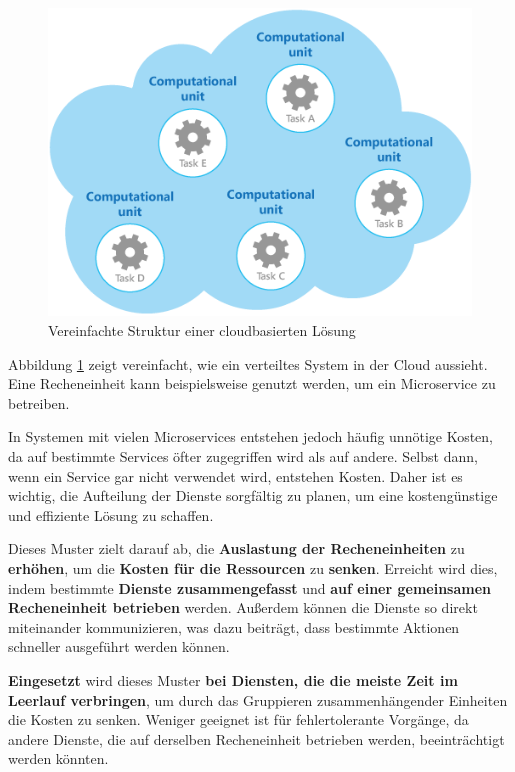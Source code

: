     \begin{figure}[H]
        \centering
        \includegraphics[width=0.55\linewidth]{images/EA/compute-resource-consolidation.png}
        \caption{Vereinfachte Struktur einer cloudbasierten Lösung \\ \cite{EA:Web33}}
        \label{fig:compute-resource-consolidation}
    \end{figure}

    Abbildung \ref{fig:compute-resource-consolidation} zeigt vereinfacht, wie ein verteiltes System in der Cloud aussieht.
    Eine Recheneinheit kann beispielsweise genutzt werden, um ein Microservice zu betreiben.

    In Systemen mit vielen Microservices entstehen jedoch häufig unnötige Kosten, da auf bestimmte Services öfter zugegriffen wird als auf andere. 
    Selbst dann, wenn ein Service gar nicht verwendet wird, entstehen Kosten. Daher ist es wichtig, die Aufteilung der Dienste sorgfältig zu planen, um eine kostengünstige und effiziente Lösung zu schaffen.

    Dieses Muster zielt darauf ab, die \textbf{Auslastung der Recheneinheiten} zu \textbf{erhöhen}, um die \textbf{Kosten für die Ressourcen} zu \textbf{senken}. Erreicht wird dies, indem bestimmte \textbf{Dienste zusammengefasst} und \textbf{auf einer gemeinsamen Recheneinheit betrieben} werden. Außerdem können die Dienste so direkt miteinander kommunizieren, was dazu beiträgt, dass bestimmte Aktionen schneller ausgeführt werden können.

    \textbf{Eingesetzt} wird dieses Muster \textbf{bei Diensten, die die meiste Zeit im Leerlauf verbringen}, um durch das Gruppieren zusammenhängender Einheiten die Kosten zu senken. Weniger geeignet ist für fehlertolerante Vorgänge, da andere Dienste, die auf derselben Recheneinheit betrieben werden, beeinträchtigt werden könnten. \\
    \cite{EA:Web33}

    \clearpage

